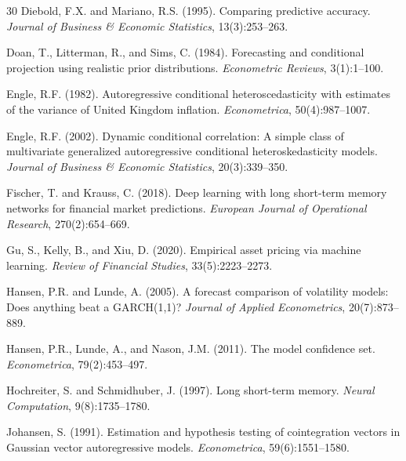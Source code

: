 \documentclass[11pt,a4paper,twocolumn]{article}
\begin{document}
\begin{thebibliography}{30}
Diebold, F.X. and Mariano, R.S. (1995).
\newblock Comparing predictive accuracy.
\newblock \emph{Journal of Business \& Economic Statistics}, 13(3):253--263.

Doan, T., Litterman, R., and Sims, C. (1984).
\newblock Forecasting and conditional projection using realistic prior
  distributions.
\newblock \emph{Econometric Reviews}, 3(1):1--100.

Engle, R.F. (1982).
\newblock Autoregressive conditional heteroscedasticity with estimates of the
  variance of {U}nited {K}ingdom inflation.
\newblock \emph{Econometrica}, 50(4):987--1007.

Engle, R.F. (2002).
\newblock Dynamic conditional correlation: A simple class of multivariate
  generalized autoregressive conditional heteroskedasticity models.
\newblock \emph{Journal of Business \& Economic Statistics}, 20(3):339--350.

Fischer, T. and Krauss, C. (2018).
\newblock Deep learning with long short-term memory networks for financial
  market predictions.
\newblock \emph{European Journal of Operational Research}, 270(2):654--669.

Gu, S., Kelly, B., and Xiu, D. (2020).
\newblock Empirical asset pricing via machine learning.
\newblock \emph{Review of Financial Studies}, 33(5):2223--2273.

Hansen, P.R. and Lunde, A. (2005).
\newblock A forecast comparison of volatility models: Does anything beat a
  {GARCH}(1,1)?
\newblock \emph{Journal of Applied Econometrics}, 20(7):873--889.

Hansen, P.R., Lunde, A., and Nason, J.M. (2011).
\newblock The model confidence set.
\newblock \emph{Econometrica}, 79(2):453--497.

Hochreiter, S. and Schmidhuber, J. (1997).
\newblock Long short-term memory.
\newblock \emph{Neural Computation}, 9(8):1735--1780.

Johansen, S. (1991).
\newblock Estimation and hypothesis testing of cointegration vectors in
  {G}aussian vector autoregressive models.
\newblock \emph{Econometrica}, 59(6):1551--1580.


\end{thebibliography}
\end{document}
